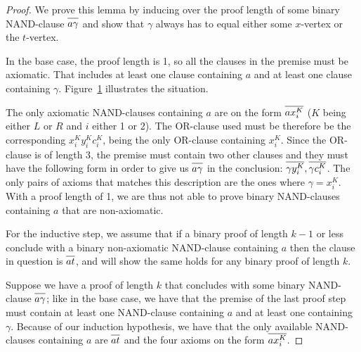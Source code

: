 \begin{proof}
We prove this lemma by inducing over the proof length of some binary NAND-clause $\ol{a\gamma}$ and show that $\gamma$ always has to equal either some $x$-vertex or the $t$-vertex.

In the base case, the proof length is 1, so all the clauses in the premise must be axiomatic.
That includes at least one clause containing $a$ and at least one clause containing $\gamma$.
Figure~\ref{fig:nand_base_case} illustrates the situation.\par
\begin{figure}[!h]
  \centering
  \begin{prooftree*}
  \end{prooftree*}
  \caption{}
  \label{fig:nand_base_case}
\end{figure}
\FloatBarrier
The only axiomatic NAND-clauses containing $a$ are on the form $\ol{ax^K_i}$ ($K$ being either $L$ or $R$ and $i$ either 1 or 2).
The OR-clause used must be therefore be the corresponding $x^K_iy^K_ic^K_i$, being the only OR-clause containing $x^K_i$.
Since the OR-clause is of length 3, the premise must contain two other clauses and they must have the following form in order to give us $\ol{a \gamma}$ in the conclusion:
$\ol{\gamma y^K_i},\ol{\gamma c^K_i}$.
The only pairs of axioms that matches this description are the ones where $\gamma = x^K_i$.
With a proof length of 1, we are thus not able to prove binary NAND-clauses containing $a$ that are non-axiomatic.

For the inductive step, we assume that if a binary proof of length $k-1$ or less conclude with a binary non-axiomatic NAND-clause containing $a$ then the clause in question is $\ol{at}$, and will show the same holds for any binary proof of length $k$.

Suppose we have a proof of length $k$ that concludes with some binary NAND-clause $\ol{a\gamma}$;
like in the base case, we have that the premise of the last proof step must contain at least one NAND-clause containing $a$ and at least one containing $\gamma$.
Because of our induction hypothesis, we have that the only available NAND-clauses containing $a$ are $\ol{at}$ and the four axioms on the form $\ol{ax^K_i}$.


\end{proof}
